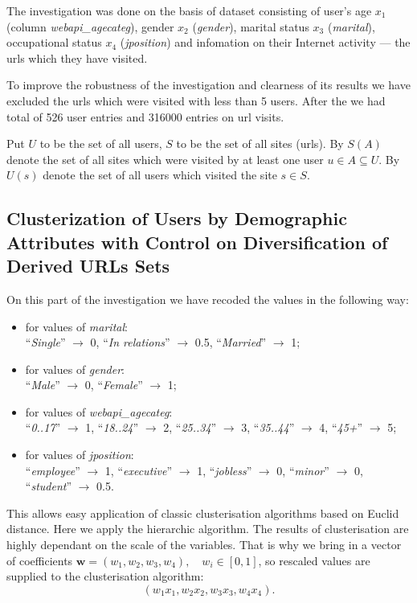 \documentclass[runningheads,a4paper]{llncs}
\begin{document}
The investigation was done on the basis of dataset consisting of user's age $x_1$ (column \textit{webapi\_agecateg}), gender $x_2$ (\textit{gender}), marital status $x_3$ (\textit{marital}), occupational status $x_4$ (\textit{jposition}) and infomation on their Internet activity --- the urls which they have visited. 

To improve the robustness of the investigation and clearness of its results we have excluded the urls which were visited with less than 5 users. After the we had total of 526 user entries and 316000 entries on url visits.

Put $U$ to be the set of all users, $S$ to be the set of all sites (urls). By $S(A)$ denote the set of all sites which were visited by at least one user $u \in A \subseteq U$. By $U(s)$ denote the set of all users which visited the site $s \in S$.



\subsection{Clusterization of Users by Demographic Attributes with Control on Diversification of Derived URLs Sets}



On this part of the investigation we have recoded the values in the following way:
\begin{itemize}
\item for values of \textit{marital}: \\ 
	``\textit{Single}''  $\to$ 0,  \quad  ``\textit{In relations}''  $\to$ 0.5, \quad  ``\textit{Married}''  $\to$ 1;
\item for values of \textit{gender}: \\ 
	``\textit{Male}''  $\to$ 0, \quad  ``\textit{Female}'' $\to$ 1;
\item for values of \textit{webapi\_agecateg}: \\ 
	``\textit{0..17}''  $\to$ 1, \quad  ``\textit{18..24}''  $\to$ 2, \quad     ``\textit{25..34}''  $\to$ 3, \quad  ``\textit{35..44}''  $\to$ 4, \quad     ``\textit{45+}''  $\to$ 5;
\item for values of \textit{jposition}: \\ 
	``\textit{employee}'' $\to$ 1, \quad  ``\textit{executive}'' $\to$ 1, \quad  ``\textit{jobless}'' $\to$ 0, \quad  ``\textit{minor}'' $\to$ 0, \quad  ``\textit{student}'' $\to$ 0.5.
\end{itemize}

This allows easy application of classic clusterisation algorithms based on  	Euclid distance. Here we apply the hierarchic algorithm. The results of clusterisation are highly dependant on the scale of the variables. That is why we bring in a vector of coefficients $\boldsymbol{w} = (w_1, w_2, w_3, w_4), \quad w_i \in [0, 1]$, so rescaled values are supplied to the clusterisation algorithm:
\[
	(w_1 x_1, w_2 x_2, w_3 x_3, w_4 x_4).
\]
\end{document}
